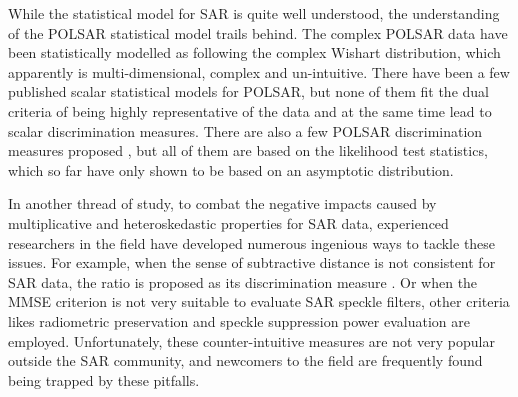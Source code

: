 
While
                the statistical model for SAR is quite well understood,
the
                understanding of the POLSAR statistical model trails behind.
The
                complex POLSAR data have been statistically modelled as
                following the complex Wishart distribution, which
                apparently is multi-dimensional, complex and
                un-intuitive.
There
                have been a few published scalar statistical models for
                POLSAR, \cite{Alberga_2008_IJRS_4129, Joughin_1994_TGRS_562, Lee_1994_TGRS_1017, Touzi_1996_TGRS_519, Barakat_1985_IJOptics, Eliyahu_1993_PhysRevE_2881, Brosseau_1995_AppliedOptics_4788} but none of them fit the dual criteria of being
                highly representative of the data and at the same time
                lead to scalar discrimination measures.
There
                are also a few POLSAR discrimination measures proposed \cite{Lee_1994_IJRS_2299, Kersten_2005_TGRS_519, Lee_2011_IGARSS_3740, Cao_2007_TGRS_3454, Conradsen_2003_TGRS_4},
                but all of them are based on the likelihood test
                statistics, which so far have only shown to be based on an
                asymptotic distribution.

 In
                another thread of study, to combat the negative
                impacts caused by multiplicative and heteroskedastic
                properties for SAR data, experienced researchers in the
                field have developed numerous ingenious ways to tackle
                these issues.
For
                example, when the sense of subtractive distance is not
                consistent for SAR data, the ratio is proposed as its
                discrimination measure \cite{Rignot_1993_TGRS_896}.
Or
                when the MMSE criterion is not very suitable to evaluate
                SAR speckle filters, other criteria likes radiometric
                preservation and speckle suppression power evaluation
                are employed. 
Unfortunately,
                these counter-intuitive measures are not very popular
                outside the SAR community, and newcomers to the field
                are frequently found being trapped by these pitfalls.

